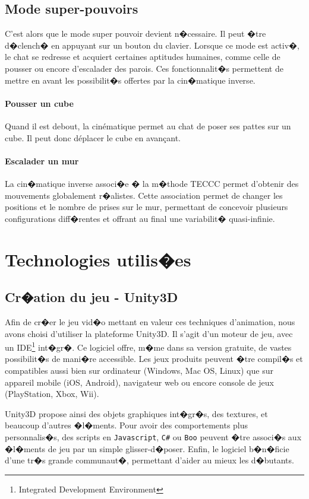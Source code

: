 \documentclass[a4paper,11pt]{article}
\begin{document}
\subsection{Mode super-pouvoirs}
C'est alors que le mode super pouvoir devient n�cessaire. Il peut �tre d�clench� en appuyant sur un bouton du clavier. Lorsque ce mode est activ�, le chat se redresse et acquiert certaines aptitudes humaines, comme celle de pousser ou encore d'escalader des parois. Ces fonctionnalit�s permettent de mettre en avant les possibilit�s offertes par la cin�matique inverse.

\paragraph{Pousser un cube}
Quand il est debout, la cinématique permet au chat de poser ses pattes sur un cube. Il peut donc déplacer le cube en avançant.
\paragraph{Escalader un mur}
La cin�matique inverse associ�e � la m�thode TECCC permet d'obtenir des mouvements globalement r�alistes. Cette association permet de changer les positions et le nombre de prises sur le mur, permettant de concevoir plusieurs configurations diff�rentes et offrant au final une variabilit� quasi-infinie.

\section{Technologies utilis�es}
\subsection{Cr�ation du jeu - Unity3D}

Afin de cr�er le jeu vid�o mettant en valeur ces techniques d'animation, nous avons choisi d'utiliser la plateforme Unity3D. Il s'agit d'un moteur de jeu, avec un IDE\footnote{Integrated Development Environment} int�gr�. Ce logiciel offre, m�me dans sa version gratuite, de vastes possibilit�s de mani�re accessible. Les jeux produits peuvent �tre compil�s et compatibles aussi bien sur ordinateur (Windows, Mac OS, Linux) que sur appareil mobile (iOS, Android), navigateur web ou encore console de jeux (PlayStation, Xbox, Wii).

Unity3D propose ainsi des objets graphiques int�gr�s, des textures, et beaucoup d'autres �l�ments. Pour avoir des comportements plus personnalis�s, des scripts en \texttt{Javascript}, \texttt{C\#} ou \texttt{Boo} peuvent �tre associ�s aux �l�ments de jeu par un simple glisser-d�poser. Enfin, le logiciel b�n�ficie d'une tr�s grande communaut�, permettant d'aider au mieux les d�butants. 
\end{document}
